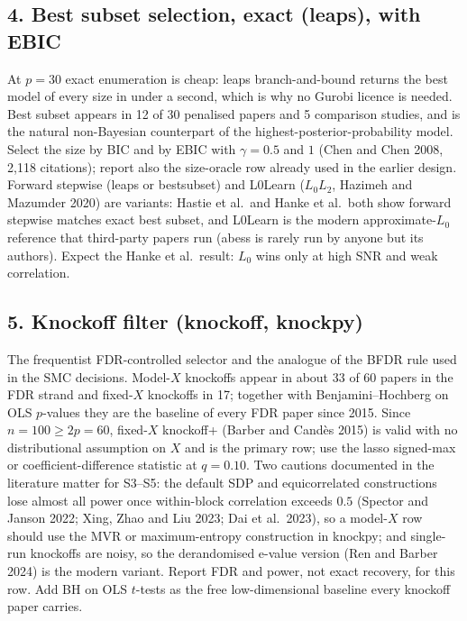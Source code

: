 \documentclass[11pt,letterpaper]{article}
\newcommand{\pkg}[1]{\textsf{#1}}
\begin{document}
\subsection*{4. Best subset selection, exact (\pkg{leaps}), with EBIC}
At $p=30$ exact enumeration is cheap: \pkg{leaps} branch-and-bound returns the best model of every size in under a second, which is why no Gurobi licence is needed. Best subset appears in 12 of 30 penalised papers and 5 comparison studies, and is the natural non-Bayesian counterpart of the highest-posterior-probability model. Select the size by BIC and by EBIC with $\gamma=0.5$ and $1$ (Chen and Chen 2008, 2{,}118 citations); report also the size-oracle row already used in the earlier design. Forward stepwise (\pkg{leaps} or \pkg{bestsubset}) and \pkg{L0Learn} ($L_0L_2$, Hazimeh and Mazumder 2020) are variants: Hastie et al.\ and Hanke et al.\ both show forward stepwise matches exact best subset, and \pkg{L0Learn} is the modern approximate-$L_0$ reference that third-party papers run (\pkg{abess} is rarely run by anyone but its authors). Expect the Hanke et al.\ result: $L_0$ wins only at high SNR and weak correlation.

\subsection*{5. Knockoff filter (\pkg{knockoff}, \pkg{knockpy})}
The frequentist FDR-controlled selector and the analogue of the BFDR rule used in the SMC decisions. Model-$X$ knockoffs appear in about 33 of 60 papers in the FDR strand and fixed-$X$ knockoffs in 17; together with Benjamini--Hochberg on OLS $p$-values they are the baseline of every FDR paper since 2015. Since $n=100\ge 2p=60$, fixed-$X$ knockoff+ (Barber and Candès 2015) is valid with no distributional assumption on $X$ and is the primary row; use the lasso signed-max or coefficient-difference statistic at $q=0.10$. Two cautions documented in the literature matter for S3--S5: the default SDP and equicorrelated constructions lose almost all power once within-block correlation exceeds $0.5$ (Spector and Janson 2022; Xing, Zhao and Liu 2023; Dai et al.\ 2023), so a model-$X$ row should use the MVR or maximum-entropy construction in \pkg{knockpy}; and single-run knockoffs are noisy, so the derandomised e-value version (Ren and Barber 2024) is the modern variant. Report FDR and power, not exact recovery, for this row. Add BH on OLS $t$-tests as the free low-dimensional baseline every knockoff paper carries.
\end{document}
